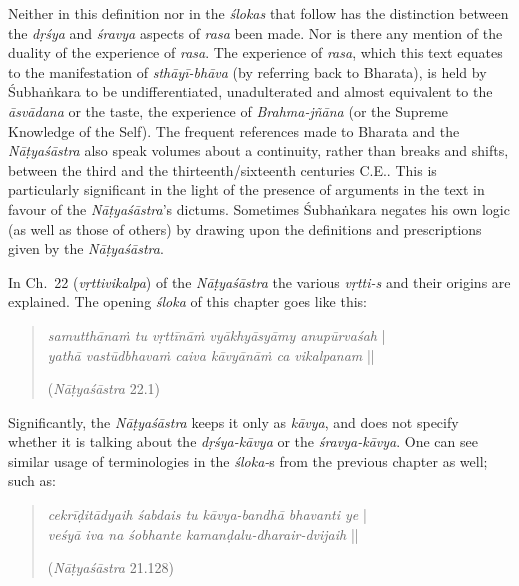 Neither in this definition nor in the \textsl{ślokas} that follow has the distinction between the \textsl{dṛśya} and \textsl{śravya} aspects of \textsl{rasa} been made. Nor is there any mention of the duality of the experience of \textsl{rasa}. The experience of \textsl{rasa}, which this text equates to the manifestation of \textsl{sthāyī-bhāva} (by referring back to Bharata), is held by Śubhaṅkara to be undifferentiated, unadulterated and almost equivalent to the \textsl{āsvādana} or the taste, the experience of \textsl{Brahma-jñāna} (or the Supreme Knowledge of the Self). The frequent references made to Bharata and the \textsl{Nāṭyaśāstra} also speak volumes about a continuity, rather than breaks and shifts, between the third and the thirteenth/sixteenth centuries C.E.. This is particularly significant in the light of the presence of arguments in the text in favour of the \textsl{Nāṭyaśāstra}’s dictums. Sometimes Śubhaṅkara negates his own logic (as well as those of others) by drawing upon the definitions and prescriptions given by the \textsl{Nāṭyaśāstra}.       

In Ch.~22 (\textsl{vṛttivikalpa}) of the \textsl{Nāṭyaśāstra} the various \textsl{vṛtti-s} and their origins are explained. The opening \textsl{śloka} of this chapter goes like this:
\begin{quote}
\textsl{samutthānaṁ tu vṛttīnāṁ vyākhyāsyāmy anupūrvaśah} |  \\
\textsl{yathā vastūdbhavaṁ caiva kāvyānāṁ ca vikalpanam} ||

\hfill(\textsl{Nāṭyaśāstra} 22.1)
\end{quote}

Significantly, the \textsl{Nāṭyaśāstra} keeps it only as \textsl{kāvya}, and does not specify whether it is talking about the \textsl{dṛśya-kāvya} or the \textsl{śravya-kāvya}. One can see similar usage of terminologies in the \textsl{śloka-}s from the previous chapter as well; such as:
\begin{quote}
\textsl{cekrīḍitādyaih śabdais tu kāvya-bandhā bhavanti ye} |\\
\textsl{veśyā iva na śobhante kamanḍalu-dharair-dvijaih} ||

\hfill(\textsl{Nāṭyaśāstra} 21.128)
\end{quote}

